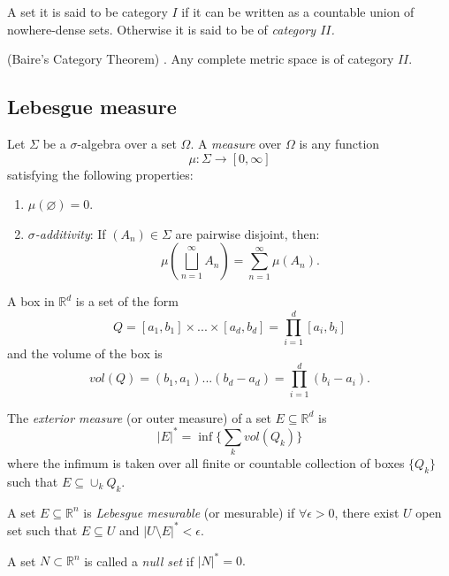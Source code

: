 \documentclass[../main.tex]{subfiles}
\begin{document}
\begin{definition}
	A set it is said to be category $I$ if it can be written as a countable union of nowhere-dense sets. Otherwise it is said to be of \emph{category $II$.}
\end{definition}
\begin{theorem} (Baire's Category Theorem) \cite{bach}. \label{baire}Any complete metric space is of category $II$. 
\end{theorem}


\subsection{Lebesgue measure}


\begin{definition}
	Let $\Sigma$ be a $\sigma$-algebra over a set $\Omega$. A \emph{measure} over $\Omega$ is any function $$\mu:\Sigma\longrightarrow[0,\infty]$$ satisfying the following properties:
	\begin{enumerate}
		\item $\mu(\varnothing)=0$.
		\item\label{RFA:sigmaadditivity} \emph{$\sigma$-additivity}: If $(A_n)\in\Sigma$ are pairwise disjoint, then: $$\mu\left(\bigsqcup_{n=1}^\infty A_n\right)=\sum_{n=1}^\infty \mu(A_n).$$
	\end{enumerate}
\end{definition}

\begin{definition} A box in $\mathbb{R}^d$ is a set of the form 
	$$ Q = [a_1,b_1]  \times ... \times [a_d,b_d] = \prod_{i=1}^d [a_i,b_i]$$
	and the volume of the box is $$ vol(Q)= (b_1,a_1) ... (b_d-a_d)= \prod_{i=1}^d (b_i-a_i).$$
	\end{definition}
\begin{definition}
	The \emph{exterior measure} (or outer measure) of a set $E\subseteq \mathbb{R}^d$ is $$ |E|^* = \inf\{\sum_k vol(Q_k)\} $$ 
	where the infimum is taken over all finite or countable collection of boxes $\{Q_k\}$ such that $E \subseteq \cup_k Q_k.$
\end{definition}

\begin{definition}
A set $E\subseteq \mathbb{R}^n $ is \emph{Lebesgue mesurable} (or mesurable) if $\forall \epsilon >0$, there exist $U$ open set such that $E \subseteq U$ and $|U\setminus E|^* < \epsilon.$
\end{definition}

\begin{definition}
A set $N \subset \mathbb{R}^n $ is called a \textit{null set }if $|N|^*=0.$
\end{definition}
\end{document}
